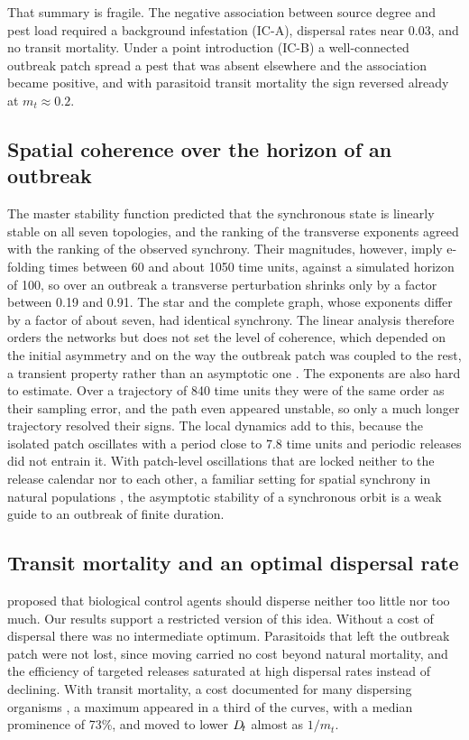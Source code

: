 That summary is fragile. The negative association between source degree and pest load required a background infestation (IC-A), dispersal rates near $0.03$, and no transit mortality. Under a point introduction (IC-B) a well-connected outbreak patch spread a pest that was absent elsewhere and the association became positive, and with parasitoid transit mortality the sign reversed already at $m_t \approx 0.2$.

\subsection*{Spatial coherence over the horizon of an outbreak}

The master stability function \citep{pecora1998,arenas2008} predicted that the synchronous state is linearly stable on all seven topologies, and the ranking of the transverse exponents agreed with the ranking of the observed synchrony. Their magnitudes, however, imply e-folding times between 60 and about 1050 time units, against a simulated horizon of 100, so over an outbreak a transverse perturbation shrinks only by a factor between 0.19 and 0.91. The star and the complete graph, whose exponents differ by a factor of about seven, had identical synchrony. The linear analysis therefore orders the networks but does not set the level of coherence, which depended on the initial asymmetry and on the way the outbreak patch was coupled to the rest, a transient property rather than an asymptotic one \citep{hastings2018}. The exponents are also hard to estimate. Over a trajectory of 840 time units they were of the same order as their sampling error, and the path even appeared unstable, so only a much longer trajectory resolved their signs. The local dynamics add to this, because the isolated patch oscillates with a period close to 7.8 time units and periodic releases did not entrain it. With patch-level oscillations that are locked neither to the release calendar nor to each other, a familiar setting for spatial synchrony in natural populations \citep{liebhold2004}, the asymptotic stability of a synchronous orbit is a weak guide to an outbreak of finite duration.

\subsection*{Transit mortality and an optimal dispersal rate}

\citet{heimpel2011} proposed that biological control agents should disperse neither too little nor too much. Our results support a restricted version of this idea. Without a cost of dispersal there was no intermediate optimum. Parasitoids that left the outbreak patch were not lost, since moving carried no cost beyond natural mortality, and the efficiency of targeted releases saturated at high dispersal rates instead of declining. With transit mortality, a cost documented for many dispersing organisms \citep{bonte2012}, a maximum appeared in a third of the curves, with a median prominence of 73\%, and moved to lower $D_{\!t}$ almost as $1/m_t$.

